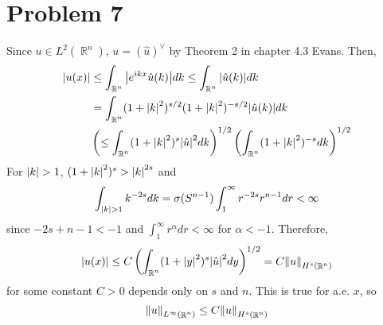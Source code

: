 \documentclass{article}
\DeclareMathOperator{\rr}{\mathbb{R}}
\begin{document}
\section*{Problem 7}
Since $u\in L^2(\rr^n)$, $u=(\hat{u})^\vee$ by Theorem 2 in chapter 4.3 Evans. Then,
\begin{equation*}
\begin{split}
\abs{u(x)}&\leq \int_{\rr^n}\abs{e^{ikx}\hat{u}(k)}dk\leq \int_{\rr^n}\abs{\hat{u}(k)}dk \\
&=\int_{\rr^n}(1+\abs{k}^2)^{s/2}(1+\abs{k}^2)^{-s/2}\abs{\hat{u}(k)}dk \\
&\left(\leq \int_{\rr^n}(1+\abs{k}^2)^{s}\abs{\hat{u}}^2dk\right)^{1/2}\left(\int_{\rr^n}(1+\abs{k}^2)^{-s}dk\right)^{1/2}
\end{split}
\end{equation*}
For $\abs{k}>1$, $(1+\abs{k}^2)^s> \abs{k}^{2s}$ and
\begin{equation*}
\int_{\abs{k}>1} k^{-2s}dk=\sigma(S^{n-1})\int_1^\infty r^{-2s}r^{n-1}dr<\infty
\end{equation*}
since $-2s+n-1<-1$ and $\int_1^\infty r^\alpha dr<\infty$ for $\alpha<-1$. Therefore,
\begin{equation*}
\abs{u(x)}\leq C\left(\int_{\rr^n}(1+\abs{y}^2)^s \abs{\hat{u}}^2 dy\right)^{1/2}=C\norm{u}_{H^s(\rr^n)}
\end{equation*}
for some constant $C>0$ depends only on $s$ and $n$. This is true for a.e. $x$, so
\begin{equation*}
\norm{u}_{L^\infty(\rr^n)}\leq C\norm{u}_{H^s(\rr^n)}
\end{equation*}
\end{document}
